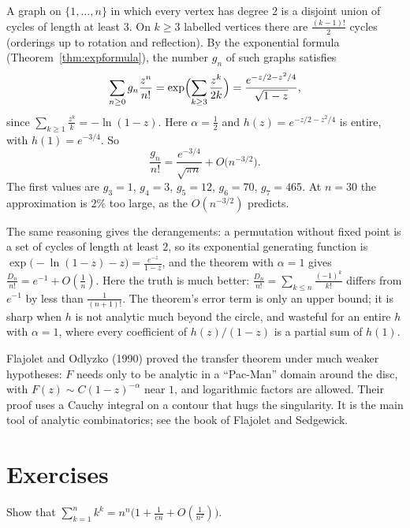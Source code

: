 \begin{example}\label{ex:tworegular}
A graph on $\{1,\dots,n\}$ in which every vertex has degree $2$ is a disjoint union of cycles of length at least $3$. On $k\ge3$ labelled vertices there
are $\frac{(k-1)!}2$ cycles (orderings up to rotation and reflection). By the exponential formula (Theorem~\ref{thm:expformula}), the number $g_n$ of such graphs
satisfies
\[
\sum_{n\ge0}g_n\frac{z^n}{n!}=\exp\Bigl(\sum_{k\ge3}\frac{z^k}{2k}\Bigr)=\frac{e^{-z/2-z^2/4}}{\sqrt{1-z}},
\]
since $\sum_{k\ge1}\frac{z^k}k=-\ln(1-z)$. Here $\alpha=\frac12$ and $h(z)=e^{-z/2-z^2/4}$ is entire, with $h(1)=e^{-3/4}$. So
\[
\frac{g_n}{n!}=\frac{e^{-3/4}}{\sqrt{\pi n}}+O\bigl(n^{-3/2}\bigr).
\]
The first values are $g_3=1$, $g_4=3$, $g_5=12$, $g_6=70$, $g_7=465$. At $n=30$ the approximation is $2\%$ too large, as the $O(n^{-3/2})$ predicts.
\end{example}

The same reasoning gives the derangements: a permutation without fixed point is a set of cycles of length at least $2$, so its exponential generating
function is $\exp\bigl(-\ln(1-z)-z\bigr)=\frac{e^{-z}}{1-z}$, and the theorem with $\alpha=1$ gives $\frac{D_n}{n!}=e^{-1}+O(\frac1n)$. Here the truth is much better:
$\frac{D_n}{n!}=\sum_{k\le n}\frac{(-1)^k}{k!}$ differs from $e^{-1}$ by less than $\frac1{(n+1)!}$. The theorem's error term is only an upper bound; it is sharp when $h$ is
not analytic much beyond the circle, and wasteful for an entire $h$ with $\alpha=1$, where every coefficient of $h(z)/(1-z)$ is a partial sum of $h(1)$.

\begin{remark}
Flajolet and Odlyzko (1990) proved the transfer theorem under much weaker hypotheses: $F$ needs only to be analytic in a ``Pac-Man'' domain around the
disc, with $F(z)\sim C(1-z)^{-\alpha}$ near $1$, and logarithmic factors are allowed. Their proof uses a Cauchy integral on a contour that hugs the singularity.
It is the main tool of analytic combinatorics; see the book of Flajolet and Sedgewick.
\end{remark}

\section{Exercises}

\begin{exercise}[$\star$]\label{ex:kk}
Show that $\sum_{k=1}^nk^k=n^n\bigl(1+\frac1{en}+O(\frac1{n^2})\bigr)$.
\end{exercise}

